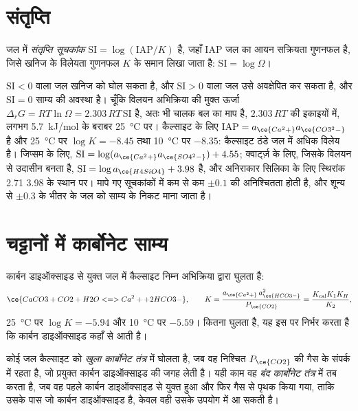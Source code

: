 \section{संतृप्ति}\label{sec:b3:water-rock-interaction:saturation}

\begin{definition}[संतृप्ति सूचकांक]\label{def:b3:water-rock-interaction:si}
जल में \emph{संतृप्ति सूचकांक}
$\mathrm{SI} = \log(\mathrm{IAP}/K)$ है, जहाँ IAP
जल का आयन सक्रियता गुणनफल है, जिसे खनिज के विलेयता
गुणनफल $K$ के समान लिखा जाता है: $\mathrm{SI} = \log\Omega$।
\end{definition}

$\mathrm{SI} < 0$ वाला जल खनिज को घोल सकता है, और $\mathrm{SI} > 0$ वाला
जल उसे अवक्षेपित कर सकता है, और $\mathrm{SI} = 0$ साम्य की अवस्था है।
चूँकि विलयन अभिक्रिया की मुक्त ऊर्जा $\Delta_r G = RT\ln\Omega
= 2.303\,RT\,\mathrm{SI}$ है, अतः  भी चालक बल का माप है,
$2.303\,RT$ की इकाइयों में, लगभग \qty{5.7}{kJ/mol} के बराबर
\qty{25}{\celsius} पर। कैल्साइट के लिए $\mathrm{IAP} = a_{\ce{Ca^2+}}
a_{\ce{CO3^2-}}$ है और \qty{25}{\celsius} पर $\log K = -8.45$ तथा
\qty{10}{\celsius} पर $-8.35$: कैल्साइट ठंडे जल में अधिक विलेय है। जिप्सम के लिए, $\mathrm{SI} = \log(a_{\ce{Ca^2+}}a_{\ce{SO4^2-}}) + 4.55$;
क्वार्ट्ज़ के लिए, जिसके विलयन से उदासीन  बनता है, $\mathrm{SI} = \log
a_{\ce{H4SiO4}} + 3.98$ है, और अनिराकार सिलिका के लिए स्थिरांक 2.71
3.98 के स्थान पर। मापे गए सूचकांकों में कम से कम $\pm0.1$ की
अनिश्चितता होती है, और शून्य से $\pm0.3$ के भीतर के जल को साम्य के निकट माना जाता है।

\section{चट्टानों में कार्बोनेट साम्य}\label{sec:b3:water-rock-interaction:carbonate}

कार्बन डाइऑक्साइड से युक्त जल में कैल्साइट निम्न अभिक्रिया द्वारा घुलता है:
\[
\ce{CaCO3 + CO2 + H2O <=> Ca^2+ + 2 HCO3-},
\qquad K = \frac{a_{\ce{Ca^2+}}\,a_{\ce{HCO3-}}^2}{P_{\ce{CO2}}}
= \frac{K_{\mathrm{cal}}K_1K_H}{K_2},
\]
\qty{25}{\celsius} पर $\log K = -5.94$ और \qty{10}{\celsius} पर $-5.59$।
कितना घुलता है, यह इस पर निर्भर करता है कि कार्बन डाइऑक्साइड कहाँ से आती है।

\begin{definition}[खुला और बंद कार्बोनेट तंत्र]\label{def:b3:water-rock-interaction:open-closed}
कोई जल कैल्साइट को \emph{खुला कार्बोनेट तंत्र} में
घोलता है, जब वह निश्चित
$P_{\ce{CO2}}$ की गैस के संपर्क में रहता है, जो प्रयुक्त कार्बन डाइऑक्साइड की जगह लेती है।
यही काम वह \emph{बंद कार्बोनेट तंत्र} में तब करता है, जब वह
पहले कार्बन डाइऑक्साइड से युक्त हुआ और फिर गैस से पृथक किया गया, ताकि
उसके पास जो कार्बन डाइऑक्साइड है, केवल वही उसके उपयोग में आ सकती है।
\end{definition}

